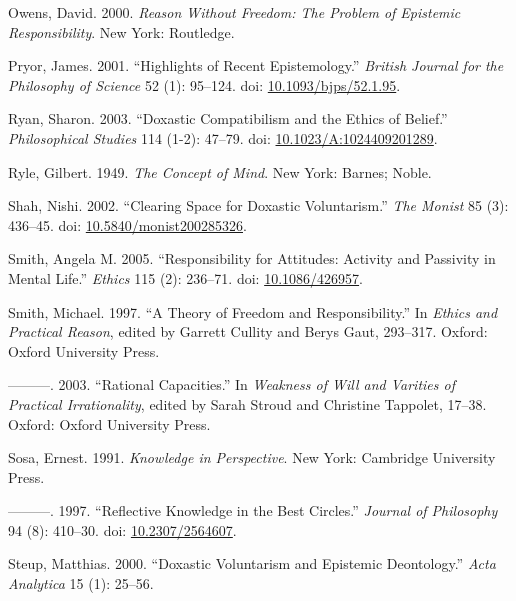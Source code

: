 \documentclass[
  10pt,
  letterpaper,
  DIV=11,
  numbers=noendperiod,
  twoside]{scrartcl}
\newlength{\cslhangindent}
\newenvironment{CSLReferences}[2] %
 {\begin{list}{}{%
  \setlength{\itemindent}{0pt}
  \setlength{\leftmargin}{0pt}
  \setlength{\parsep}{0pt}
  \ifodd #1
   \setlength{\leftmargin}{\cslhangindent}
   \setlength{\itemindent}{-1\cslhangindent}
  \fi
  \setlength{\itemsep}{#2\baselineskip}}}
 {\end{list}}
\begin{document}
\begin{CSLReferences}{1}{0}
Owens, David. 2000. \emph{Reason Without Freedom: The Problem of
Epistemic Responsibility}. New York: Routledge.

Pryor, James. 2001. {``Highlights of Recent Epistemology.''}
\emph{British Journal for the Philosophy of Science} 52 (1): 95--124.
doi: \href{https://doi.org/10.1093/bjps/52.1.95}{10.1093/bjps/52.1.95}.

Ryan, Sharon. 2003. {``Doxastic Compatibilism and the Ethics of
Belief.''} \emph{Philosophical Studies} 114 (1-2): 47--79. doi:
\href{https://doi.org/10.1023/A:1024409201289}{10.1023/A:1024409201289}.

Ryle, Gilbert. 1949. \emph{The Concept of Mind}. New York: Barnes;
Noble.

Shah, Nishi. 2002. {``Clearing Space for Doxastic Voluntarism.''}
\emph{The Monist} 85 (3): 436--45. doi:
\href{https://doi.org/10.5840/monist200285326}{10.5840/monist200285326}.

Smith, Angela M. 2005. {``Responsibility for Attitudes: Activity and
Passivity in Mental Life.''} \emph{Ethics} 115 (2): 236--71. doi:
\href{https://doi.org/10.1086/426957}{10.1086/426957}.

Smith, Michael. 1997. {``A Theory of Freedom and Responsibility.''} In
\emph{Ethics and Practical Reason}, edited by Garrett Cullity and Berys
Gaut, 293--317. Oxford: Oxford University Press.

---------. 2003. {``Rational Capacities.''} In \emph{Weakness of Will
and Varities of Practical Irrationality}, edited by Sarah Stroud and
Christine Tappolet, 17--38. Oxford: Oxford University Press.

Sosa, Ernest. 1991. \emph{Knowledge in Perspective}. New York: Cambridge
University Press.

---------. 1997. {``Reflective Knowledge in the Best Circles.''}
\emph{Journal of Philosophy} 94 (8): 410--30. doi:
\href{https://doi.org/10.2307/2564607}{10.2307/2564607}.

Steup, Matthias. 2000. {``Doxastic Voluntarism and Epistemic
Deontology.''} \emph{Acta Analytica} 15 (1): 25--56.


\end{CSLReferences}
\end{document}
